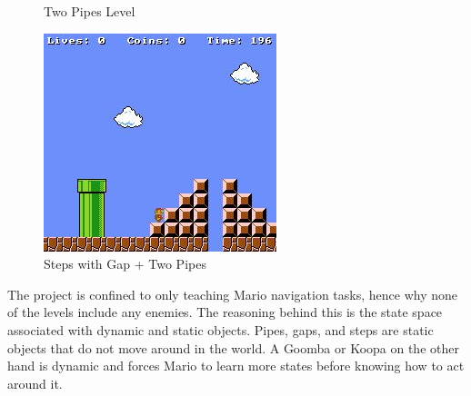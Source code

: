 \documentclass[notitlepage,a4paper,11pt]{article}
\begin{document}
\begin{figure}[!htb]
  \caption{Two Pipes Level}\label{fig:}
\endminipage\hfill
{}%
  \includegraphics[width=\linewidth]{figs/steps_pipe_level.png}
  \caption{Steps with Gap + Two Pipes}\label{fig:awesome_image3}
\endminipage
\end{figure}

The project is confined to only teaching Mario navigation tasks, hence why none of the levels include any enemies. The reasoning behind this is the state space associated with dynamic and static objects. Pipes, gaps, and steps are static objects that do not move around in the world. A Goomba or Koopa on the other hand is dynamic and forces Mario to learn more states before knowing how to act around it.
\end{document}
